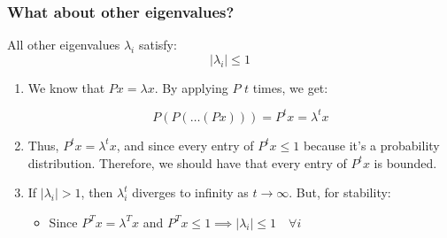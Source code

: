 \subsubsection{What about other eigenvalues?}
\begin{definition}
    All other eigenvalues $\lambda_i$ satisfy:    
        \[
        |\lambda_i| \leq 1
        \]
\end{definition}

\begin{derivation}
    \begin{enumerate}
        \item We know that $P x = \lambda x$. By applying $P$ $t$ times, we get:

        \[
        P(P(\dots(Px))) = P^t x = \lambda^t x
        \]
        
        \item Thus, $P^t x = \lambda^t x$, and since every entry of $P^t x \leq 1$ because it's a probability distribution. Therefore, we should have that every entry of $P^t x$ is bounded.
        
        \item If $|\lambda_i| > 1$, then $\lambda_i^t$ diverges to infinity as $t \to \infty$. But, for stability:
        \begin{itemize}
            \item Since $P^T x = \lambda^T x$ and $P^T x \leq 1 \implies |\lambda_i| \leq 1 \quad \forall i$
        \end{itemize}
    \end{enumerate}
\end{derivation}

